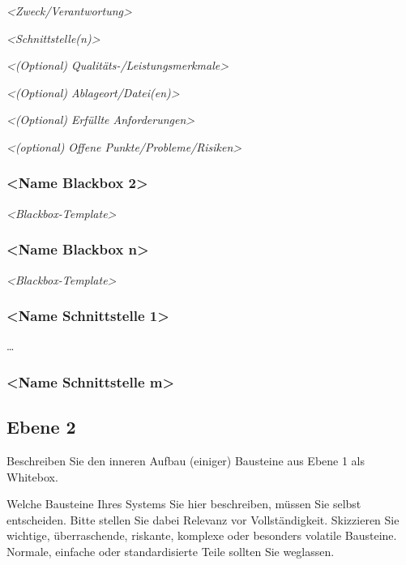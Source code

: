 \documentclass[]{article}
\begin{document}
\emph{\textless{}Zweck/Verantwortung\textgreater{}}

\emph{\textless{}Schnittstelle(n)\textgreater{}}

\emph{\textless{}(Optional) Qualitäts-/Leistungsmerkmale\textgreater{}}

\emph{\textless{}(Optional) Ablageort/Datei(en)\textgreater{}}

\emph{\textless{}(Optional) Erfüllte Anforderungen\textgreater{}}

\emph{\textless{}(optional) Offene
Punkte/Probleme/Risiken\textgreater{}}

\hypertarget{__name_blackbox_2}{%
\subsubsection{\textless{}Name Blackbox
2\textgreater{}}\label{__name_blackbox_2}}

\emph{\textless{}Blackbox-Template\textgreater{}}

\hypertarget{__name_blackbox_n}{%
\subsubsection{\textless{}Name Blackbox
n\textgreater{}}\label{__name_blackbox_n}}

\emph{\textless{}Blackbox-Template\textgreater{}}

\hypertarget{__name_schnittstelle_1}{%
\subsubsection{\textless{}Name Schnittstelle
1\textgreater{}}\label{__name_schnittstelle_1}}

\ldots{}

\hypertarget{__name_schnittstelle_m}{%
\subsubsection{\textless{}Name Schnittstelle
m\textgreater{}}\label{__name_schnittstelle_m}}

\hypertarget{_ebene_2}{%
\subsection{Ebene 2}\label{_ebene_2}}

Beschreiben Sie den inneren Aufbau (einiger) Bausteine aus Ebene 1 als
Whitebox.

Welche Bausteine Ihres Systems Sie hier beschreiben, müssen Sie selbst
entscheiden. Bitte stellen Sie dabei Relevanz vor Vollständigkeit.
Skizzieren Sie wichtige, überraschende, riskante, komplexe oder
besonders volatile Bausteine. Normale, einfache oder standardisierte
Teile sollten Sie weglassen.
\end{document}
